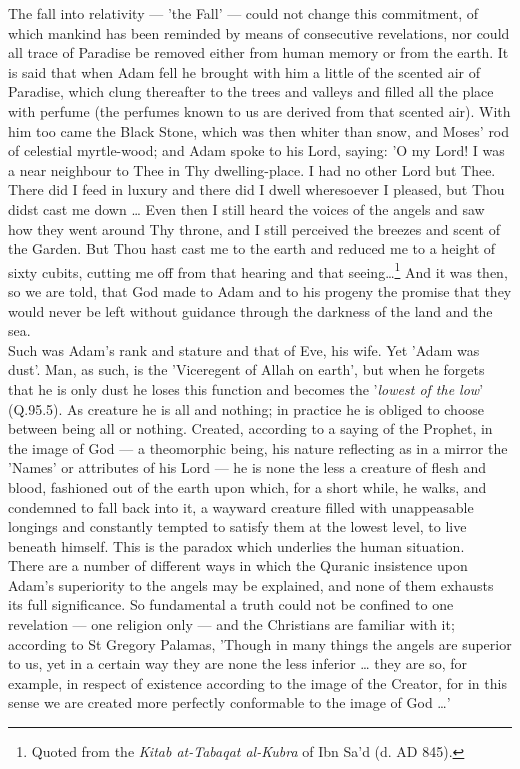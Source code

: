 \documentclass[11pt, b5paper, twoside]{book}
\begin{document}
The fall into relativity --- 'the Fall' --- could not change this commitment, of which mankind has been 
reminded by means of consecutive revelations, nor could all trace of Paradise be removed either from 
human memory or from the earth. It is said that when Adam fell he brought with him a little of the 
scented air of Paradise, which clung thereafter to the trees and valleys and filled all the place 
with perfume (the perfumes known to us are derived from that scented air). With him too came the 
Black Stone, which was then whiter than snow, and Moses' rod of celestial myrtle-wood; and Adam spoke 
to his Lord, saying: 'O my Lord! I was a near neighbour to Thee in Thy dwelling-place. I had no other 
Lord but Thee. There did I feed in luxury and there did I dwell wheresoever I pleased, but Thou didst 
cast me down \ldots{} Even then I still heard the voices of the angels and saw how they went around Thy 
throne, and I still perceived the breezes and scent of the Garden. But Thou hast cast me to the earth 
and reduced me to a height of sixty cubits, cutting me off from that hearing and that seeing\ldots{}\footnote{Quoted from the \emph{Kitab at-Tabaqat al-Kubra} of Ibn Sa'd (d. AD 845).}
And it was then, so we are told, that God made to Adam and to his progeny the promise that they would 
never be left without guidance through the darkness of the land and the sea. \\

Such was Adam's rank and stature and that of Eve, his wife. Yet 'Adam was dust'. Man, as such, is the 
'Viceregent of Allah on earth', but when he forgets that he is only dust he loses this function and 
becomes the '\emph{lowest of the low}' (Q.95.5). As creature he is all and nothing; in practice he is obliged 
to choose between being all or nothing. Created, according to a saying of the Prophet, in the image 
of God --- a theomorphic being, his nature reflecting as in a mirror the 'Names' or attributes of his 
Lord --- he is none the less a creature of flesh and blood, fashioned out of the earth upon which, for 
a short while, he walks, and condemned to fall back into it, a wayward creature filled with 
unappeasable longings and constantly tempted to satisfy them at the lowest level, to live beneath 
himself. This is the paradox which underlies the human situation. \\

There are a number of different ways in which the Quranic insistence upon Adam's superiority to the 
angels may be explained, and none of them exhausts its full significance. So fundamental a truth 
could not be confined to one revelation --- one religion only --- and the Christians are familiar with 
it; according to St Gregory Palamas, 'Though in many things the angels are superior to us, yet in a 
certain way they are none the less inferior \ldots{} they are so, for example, in respect of existence 
according to the image of the Creator, for in this sense we are created more perfectly conformable to 
the image of God \ldots{}' \\
\end{document}
